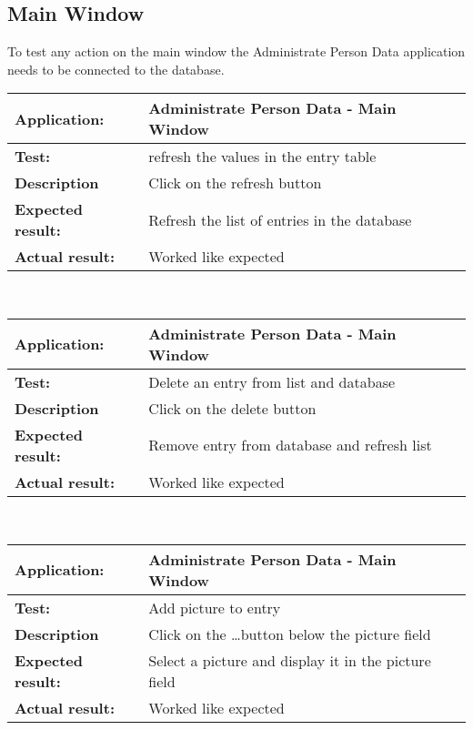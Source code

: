   \subsection{Main Window}
   To test any action on the main window the Administrate Person Data application needs to be connected to the database.\\
   \begin{tabular}{|p{3.5cm}|p{10.5cm}|}
    \hline
     \textbf{Application:}	& Administrate Person Data - Main Window\\
    \hline
     \textbf{Test:}		& refresh the values in the entry table\\
    \hline
     \textbf{Description}	& Click on the refresh button\\
    \hline
     \textbf{Expected result:}	& Refresh the list of entries in the database\\
    \hline
     \textbf{Actual result:}	& Worked like expected\\
    \hline
   \end{tabular}\\
   \begin{tabular}{|p{3.5cm}|p{10.5cm}|}
    \hline
     \textbf{Application:}	& Administrate Person Data - Main Window\\
    \hline
     \textbf{Test:}		& Delete an entry from list and database\\
    \hline
     \textbf{Description}	& Click on the delete button\\
    \hline
     \textbf{Expected result:}	& Remove entry from database and refresh list\\
    \hline
     \textbf{Actual result:}	& Worked like expected\\
    \hline
   \end{tabular}\\
   \begin{tabular}{|p{3.5cm}|p{10.5cm}|}
    \hline
     \textbf{Application:}	& Administrate Person Data - Main Window\\
    \hline
     \textbf{Test:}		& Add picture to entry\\
    \hline
     \textbf{Description}	& Click on the \dots button below the picture field\\
    \hline
     \textbf{Expected result:}	& Select a picture and display it in the picture field\\
    \hline
     \textbf{Actual result:}	& Worked like expected\\
    \hline
   \end{tabular}\\
